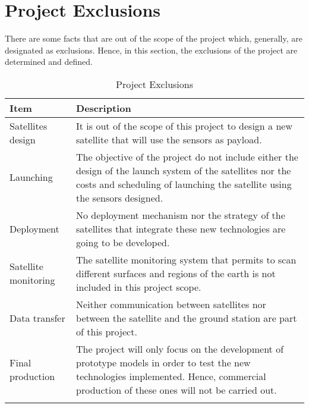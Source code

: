\section{Project Exclusions}

There are some facts that are out of the scope of the project which, generally, are designated as exclusions. Hence, in this section, the exclusions of the project are determined and defined. 

\begin{longtable}[H]{lp{11cm}}
	
	\toprule[2pt]
	
	\textbf{Item} & \textbf{Description} \\
	
	\midrule[1.5pt] 
	\endhead
	
	Satellites design & It is out of the scope of this project to design a new satellite that will use the sensors as payload.\vspace{0.2cm} \\
	
	\midrule
	
	Launching  & The objective of the project do not include either the design of the launch system of the satellites nor the costs and scheduling of launching the satellite using the sensors designed.\vspace{0.2cm} \\
	
	\midrule
	
	Deployment & No deployment mechanism nor the strategy of the satellites that integrate these new technologies are going to be developed.\vspace{0.2cm} \\
	
	\midrule
	
	Satellite monitoring & The satellite monitoring system that permits to scan different surfaces and regions of the earth is not included in this project scope.\vspace{0.2cm} \\
	
	\midrule
	
	Data transfer & Neither communication between satellites nor between the satellite and the ground station are part of this project.\vspace{0.2cm} \\
	
	\midrule
		
	Final production & The project will only focus on the development of prototype models in order to test the new technologies implemented. Hence, commercial production of these ones will not be carried out.\vspace{0.2cm} \\
	\bottomrule[2pt]
	
	\caption{Project Exclusions}
\end{longtable}